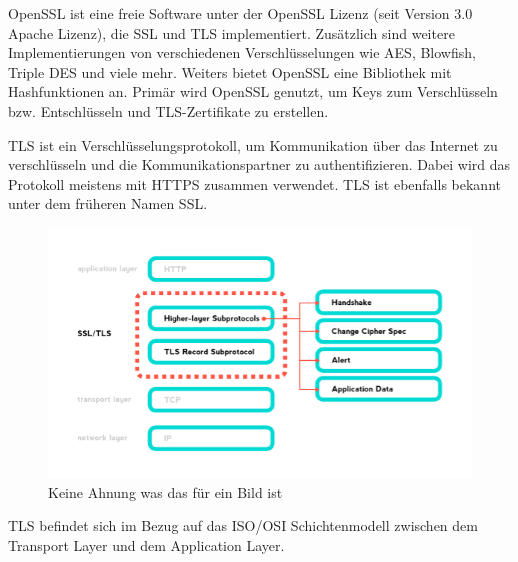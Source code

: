 
OpenSSL ist eine freie Software unter der OpenSSL Lizenz (seit Version 3.0 Apache Lizenz), die SSL und TLS implementiert. Zusätzlich sind weitere Implementierungen von verschiedenen Verschlüsselungen wie AES, Blowfish, Triple DES und viele mehr. Weiters bietet OpenSSL eine Bibliothek mit Hashfunktionen an. Primär wird OpenSSL genutzt, um Keys zum Verschlüsseln bzw. Entschlüsseln und TLS-Zertifikate zu erstellen. 



TLS ist ein Verschlüsselungsprotokoll, um Kommunikation über das Internet zu verschlüsseln und die Kommunikationspartner zu authentifizieren. Dabei wird das Protokoll meistens mit HTTPS zusammen verwendet. TLS ist ebenfalls bekannt unter dem früheren Namen SSL.  

\begin{figure}[H]
    \centering
    \includegraphics{media/OpenSSL/info.png}
    \caption{Keine Ahnung was das für ein Bild ist} %
\end{figure}

TLS befindet sich im Bezug auf das ISO/OSI Schichtenmodell zwischen dem Transport Layer und dem Application Layer.



